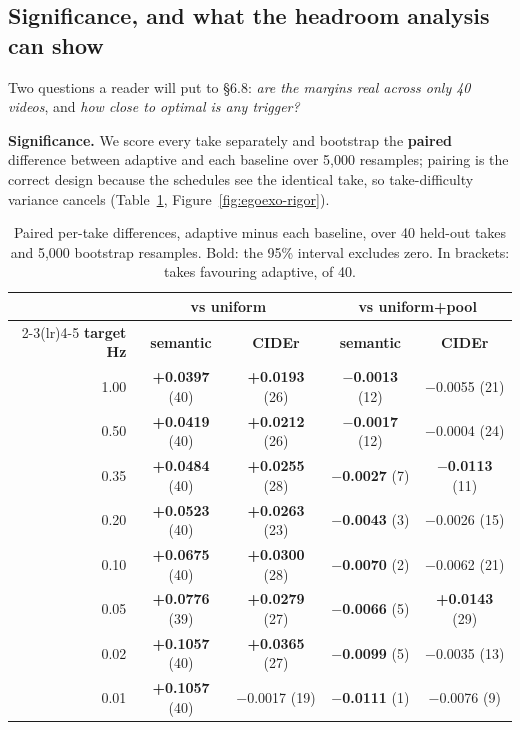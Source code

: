 \subsection{Significance, and what the headroom analysis can show}

Two questions a reader will put to \S6.8: \emph{are the margins real across only 40 videos}, and \emph{how close to optimal is any trigger?}

\textbf{Significance.} We score every take separately and bootstrap the \textbf{paired} difference between adaptive and each baseline over 5,000 resamples; pairing is the correct design because the schedules see the identical take, so take-difficulty variance cancels (Table~\ref{tab:paired}, Figure~\ref{fig:egoexo-rigor}).

\begin{table}[htbp]
\centering
\caption[Paired per-take differences against both baselines]{Paired per-take differences, adaptive minus each baseline, over 40 held-out takes and 5,000 bootstrap resamples. Bold: the 95\% interval excludes zero. In brackets: takes favouring adaptive, of 40.}
\label{tab:paired}
\small
\begin{tabular}{rcccc}
\toprule
& \multicolumn{2}{c}{\textbf{vs uniform}} & \multicolumn{2}{c}{\textbf{vs uniform+pool}} \\
\cmidrule(lr){2-3}\cmidrule(lr){4-5}
\textbf{target Hz} & \textbf{semantic} & \textbf{CIDEr} & \textbf{semantic} & \textbf{CIDEr} \\
\midrule
1.00 & \textbf{+0.0397} (40) & \textbf{+0.0193} (26) & \textbf{$-$0.0013} (12) & $-$0.0055 (21) \\
0.50 & \textbf{+0.0419} (40) & \textbf{+0.0212} (26) & \textbf{$-$0.0017} (12) & $-$0.0004 (24) \\
0.35 & \textbf{+0.0484} (40) & \textbf{+0.0255} (28) & \textbf{$-$0.0027} (7) & \textbf{$-$0.0113} (11) \\
0.20 & \textbf{+0.0523} (40) & \textbf{+0.0263} (23) & \textbf{$-$0.0043} (3) & $-$0.0026 (15) \\
0.10 & \textbf{+0.0675} (40) & \textbf{+0.0300} (28) & \textbf{$-$0.0070} (2) & $-$0.0062 (21) \\
0.05 & \textbf{+0.0776} (39) & \textbf{+0.0279} (27) & \textbf{$-$0.0066} (5) & \textbf{+0.0143} (29) \\
0.02 & \textbf{+0.1057} (40) & \textbf{+0.0365} (27) & \textbf{$-$0.0099} (5) & $-$0.0035 (13) \\
0.01 & \textbf{+0.1057} (40) & $-$0.0017 (19) & \textbf{$-$0.0111} (1) & $-$0.0076 (9) \\
\bottomrule
\end{tabular}
\end{table}

